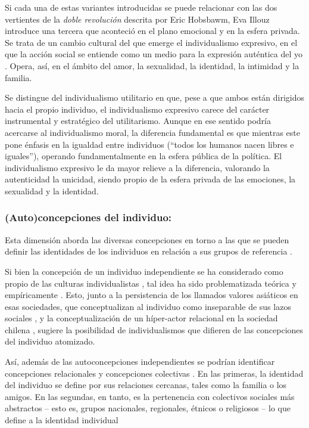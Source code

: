 \documentclass[12pt,twoside]{templates/facsothesis}
\begin{document}
Si cada una de estas variantes introducidas se puede relacionar con las dos vertientes de la \emph{doble revolución} descrita por Eric Hobsbawm, Eva Illouz \citeyearpar{illouz2020} introduce una tercera que aconteció en el plano emocional y en la esfera privada. Se trata de un cambio cultural del que emerge el individualismo expresivo, en el que la acción social se entiende como un medio para la expresión auténtica del yo \citep{cortois2018}. Opera, así, en el ámbito del amor, la sexualidad, la identidad, la intimidad y la familia.

Se distingue del individualismo utilitario en que, pese a que ambos están dirigidos hacia el propio individuo, el individualismo expresivo carece del carácter instrumental y estratégico del utilitarismo. Aunque en ese sentido podría acercarse al individualismo moral, la diferencia fundamental es que mientras este pone énfasis en la igualdad entre individuos (``todos los humanos nacen libres e iguales''), operando fundamentalmente en la esfera pública de la política. El individualismo expresivo le da mayor relieve a la diferencia, valorando la autenticidad la unicidad, siendo propio de la esfera privada de las emociones, la sexualidad y la identidad.

\hypertarget{autoconcepciones-del-individuo}{%
\subsubsection{(Auto)concepciones del individuo:}\label{autoconcepciones-del-individuo}}

Esta dimensión aborda las diversas concepciones en torno a las que se pueden definir las identidades de los individuos en relación a sus grupos de referencia \citep{brewer2007}.

Si bien la concepción de un individuo independiente se ha considerado como propio de las culturas individualistas \citep{benavides2020, cross2011}, tal idea ha sido problematizada teórica \citep{voronov2002} y empíricamente \citep{benavides2020, kolstad2009}. Esto, junto a la persistencia de los llamados valores asiáticos en esas sociedades, que conceptualizan al individuo como inseparable de sus lazos sociales \citep{zhai2022}, y la conceptualización de un híper-actor relacional en la sociedad chilena \citep{araujo2020}, sugiere la posibilidad de individualismos que difieren de las concepciones del individuo atomizado.

Así, además de las autoconcepciones independientes se podrían identificar concepciones relacionales y concepciones colectivas \citep{brewer2007}. En las primeras, la identidad del individuo se define por sus relaciones cercanas, tales como la familia o los amigos. En las segundas, en tanto, es la pertenencia con colectivos sociales más abstractos -- esto es, grupos nacionales, regionales, étnicos o religiosos -- lo que define a la identidad individual \citep{brewer2007}
\end{document}
